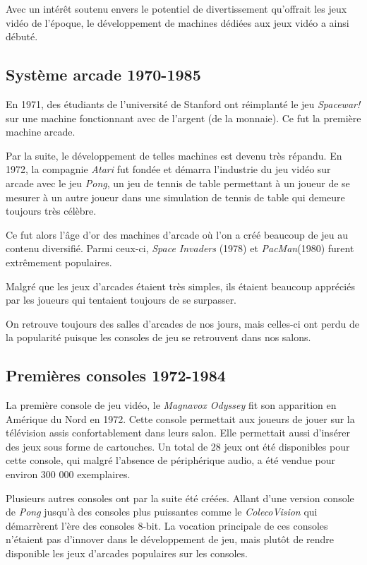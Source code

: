 \documentclass[12pt,oneside,letterpaper,francais]{book}
\newcommand{\si}{{\textit{Space Invaders }}}
\begin{document}
Avec un intérêt soutenu envers le potentiel de divertissement
qu'offrait les jeux vidéo de l'époque, le développement de machines
dédiées aux jeux vidéo a ainsi débuté.

\subsection{Système arcade 1970-1985}
En 1971, des étudiants de l'université de Stanford ont réimplanté le
jeu \textit{Spacewar!} sur une machine fonctionnant avec de l'argent
(de la monnaie). Ce fut la première machine arcade.

Par la suite, le développement de telles machines est devenu très
répandu. En 1972, la compagnie \textit{Atari} fut fondée et démarra
l'industrie du jeu vidéo sur arcade avec le jeu \textit{Pong}, un jeu
de tennis de table permettant à un joueur de se mesurer à un autre
joueur dans une simulation de tennis de table qui demeure toujours
très célèbre.

Ce fut alors l'âge d'or des machines d'arcade où l'on a créé beaucoup
de jeu au contenu diversifié. Parmi ceux-ci, \si(1978) et
\textit{PacMan}(1980) furent extrêmement populaires.

Malgré que les jeux d'arcades étaient très simples, ils étaient
beaucoup appréciés par les joueurs qui tentaient toujours de se
surpasser.

On retrouve toujours des salles d'arcades de nos jours, mais celles-ci
ont perdu de la popularité puisque les consoles de jeu se
retrouvent dans nos salons.

\subsection{Premières consoles 1972-1984}

La première console de jeu vidéo, le \textit{Magnavox Odyssey} fit son
apparition en Amérique du Nord en 1972. Cette console permettait aux
joueurs de jouer sur la télévision assis confortablement dans leurs
salon. Elle permettait aussi d'insérer des jeux sous forme de
cartouches. Un total de 28 jeux ont été disponibles pour cette
console, qui malgré l'absence de périphérique audio, a été vendue pour
environ 300 000 exemplaires.

Plusieurs autres consoles ont par la suite été créées. Allant d'une
version console de \textit{Pong} jusqu'à des consoles plus puissantes
comme le \textit{ColecoVision} qui démarrèrent l'ère des consoles
8-bit. La vocation principale de ces consoles n'étaient pas d'innover
dans le développement de jeu, mais plutôt de rendre disponible les
jeux d'arcades populaires sur les consoles.
\end{document}
